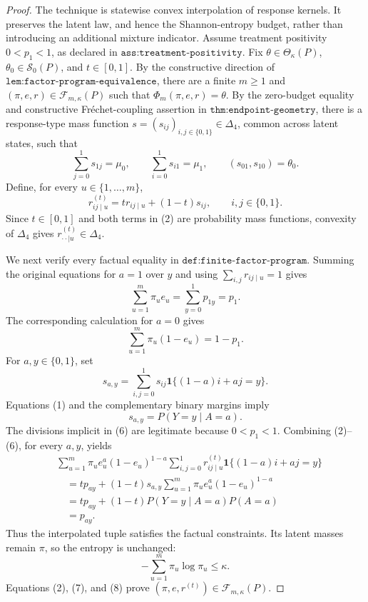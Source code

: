 \documentclass{article}
\begin{document}
\begin{proof}
The technique is statewise convex interpolation of response kernels.  It preserves the latent law, and hence the Shannon-entropy budget, rather than introducing an additional mixture indicator.  Assume treatment positivity \(0<p_1<1\), as declared in \(\texttt{ass:treatment-positivity}\).  Fix \(\theta\in\Theta_\kappa(P)\), \(\theta_0\in\mathcal S_0(P)\), and \(t\in[0,1]\).  By the constructive direction of \(\texttt{lem:factor-program-equivalence}\), there are a finite \(m\geq1\) and \((\pi,e,r)\in\mathcal F_{m,\kappa}(P)\) such that \(\Phi_m(\pi,e,r)=\theta\).  By the zero-budget equality and constructive Fréchet-coupling assertion in \(\texttt{thm:endpoint-geometry}\), there is a response-type mass function \(s=(s_{ij})_{i,j\in\{0,1\}}\in\Delta_4\), common across latent states, such that
\[
\sum_{j=0}^1s_{1j}=\mu_0,\qquad
\sum_{i=0}^1s_{i1}=\mu_1,\qquad
(s_{01},s_{10})=\theta_0.
\tag{1}
\]
Define, for every \(u\in\{1,\ldots,m\}\),
\[
r^{(t)}_{ij\mid u}=t r_{ij\mid u}+(1-t)s_{ij},
\qquad i,j\in\{0,1\}.
\tag{2}
\]
Since \(t\in[0,1]\) and both terms in (2) are probability mass functions, convexity of \(\Delta_4\) gives \(r^{(t)}_{\cdot\cdot\mid u}\in\Delta_4\).

We next verify every factual equality in \(\texttt{def:finite-factor-program}\).  Summing the original equations for \(a=1\) over \(y\) and using \(\sum_{i,j}r_{ij\mid u}=1\) gives
\[
\sum_{u=1}^m\pi_u e_u=\sum_{y=0}^1p_{1y}=p_1.
\tag{3}
\]
The corresponding calculation for \(a=0\) gives
\[
\sum_{u=1}^m\pi_u(1-e_u)=1-p_1.
\tag{4}
\]
For \(a,y\in\{0,1\}\), set
\[
s_{a,y}=\sum_{i,j=0}^1s_{ij}\mathbf 1\{(1-a)i+aj=y\}.
\tag{5}
\]
Equations (1) and the complementary binary margins imply
\[
s_{a,y}=P(Y=y\mid A=a).
\tag{6}
\]
The divisions implicit in (6) are legitimate because \(0<p_1<1\).  Combining (2)--(6), for every \(a,y\), yields
\[
\begin{aligned}
&\sum_{u=1}^m\pi_u e_u^a(1-e_u)^{1-a}
 \sum_{i,j=0}^1r^{(t)}_{ij\mid u}\mathbf 1\{(1-a)i+aj=y\}\\
&\quad=t p_{ay}+(1-t)s_{a,y}
 \sum_{u=1}^m\pi_u e_u^a(1-e_u)^{1-a}\\
&\quad=t p_{ay}+(1-t)P(Y=y\mid A=a)P(A=a)\\
&\quad=p_{ay}.
\end{aligned}
\tag{7}
\]
Thus the interpolated tuple satisfies the factual constraints.  Its latent masses remain \(\pi\), so the entropy is unchanged:
\[
-\sum_{u=1}^m\pi_u\log\pi_u\leq\kappa.
\tag{8}
\]
Equations (2), (7), and (8) prove \((\pi,e,r^{(t)})\in\mathcal F_{m,\kappa}(P)\).


\end{proof}
\end{document}
